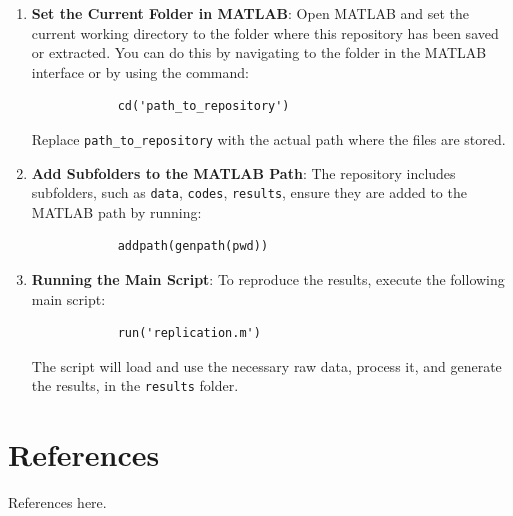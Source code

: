 \documentclass{article}
\begin{document}
	
	\begin{enumerate}
		\item \textbf{Set the Current Folder in MATLAB}:  
		Open MATLAB and set the current working directory to the folder where this repository has been saved or extracted. You can do this by navigating to the folder in the MATLAB interface or by using the command:
		\begin{verbatim}
			cd('path_to_repository')
		\end{verbatim}
		Replace \texttt{path\_to\_repository} with the actual path where the files are stored.
		
		
		\item \textbf{Add Subfolders to the MATLAB Path}:  
		The repository includes subfolders, such as \texttt{data}, \texttt{codes}, \texttt{results}, ensure they are added to the MATLAB path by running:
		\begin{verbatim}
			addpath(genpath(pwd))
		\end{verbatim}
		
		\item \textbf{Running the Main Script}:  
		To reproduce the results, execute the following main script:
		\begin{verbatim}
			run('replication.m')
		\end{verbatim}
		The script will load and use the necessary raw data, process it, and generate the results, in the \texttt{results} folder.
		
	\end{enumerate}
	
	\section*{References}
	
	\noindent References here.
	
	
\end{document}
